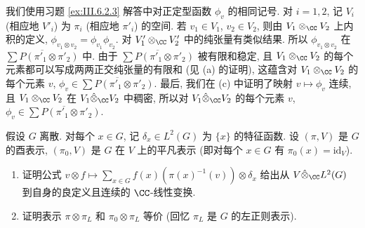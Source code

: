 \begin{solution}
我们使用习题 \ref{ex:III.6.2.3} 解答中对正定型函数 $\phi_v$ 的相同记号. 对 $i = 1, 2$, 记 $V_i$ (相应地 $V'_i$) 为 $\pi_i$ (相应地 $\pi'_i$) 的空间.
若 $v_1 \in V_1$, $v_2 \in V_2$, 则由 $V_1 \otimes_{\CC}V_2$ 上内积的定义, $\phi_{v_1 \otimes v_2} = \phi_{v_1}\phi_{v_2}$. 对 $V'_1 \otimes_{\CC}V'_2$ 中的纯张量有类似结果. 所以 $\phi_{v_1 \otimes v_2}$ 在 $\overline{\sum P(\pi'_1 \otimes \pi'_2)}$ 中. 由于 $\overline{\sum P(\pi'_1 \otimes \pi'_2)}$ 被有限和稳定, 且 $V_1 \otimes_{\CC}V_2$ 的每个元素都可以写成两两正交纯张量的有限和 (见 (a) 的证明), 这蕴含对 $V_1 \otimes_{\CC}V_2$ 的每个元素 $v$, $\phi_v \in \overline{\sum P(\pi'_1 \otimes \pi'_2)}$. 最后, 我们在 (c) 中证明了映射 $v \longmapsto \phi_v$ 连续, 且 $V_1 \otimes_{\CC}V_2$ 在 $V_1 \hat{\otimes}_{\CC}V_2$ 中稠密, 所以对 $V_1 \hat{\otimes}_{\CC}V_2$ 的每个元素 $v$, $\phi_v \in \overline{\sum P(\pi'_1 \otimes \pi'_2)}$.
\end{solution}

\begin{exercise}
\label{ex:III.6.2.10}
假设 $G$ 离散. 对每个 $x \in G$, 记 $\delta_x \in L^2(G)$ 为 $\{x\}$ 的特征函数.
设 $(\pi, V)$ 是 $G$ 的酉表示, $(\pi_0, V)$ 是 $G$ 在 $V$ 上的平凡表示 (即对每个 $x \in G$ 有 $\pi_0(x) = \mathrm{id}_V$).
\begin{enumerate}
\item[(a)] 证明公式 $v \otimes f \longmapsto \sum_{x \in G}f(x)(\pi(x)^{-1}(v)) \otimes \delta_x$ 给出从 $V \hat{\otimes}_{\CC}L^2(G)$ 到自身的良定义且连续的 $\CC$-线性变换.
\item[(b)] 证明表示 $\pi \otimes \pi_L$ 和 $\pi_0 \otimes \pi_L$ 等价 (回忆 $\pi_L$ 是 $G$ 的左正则表示).
\end{enumerate}
\end{exercise}

